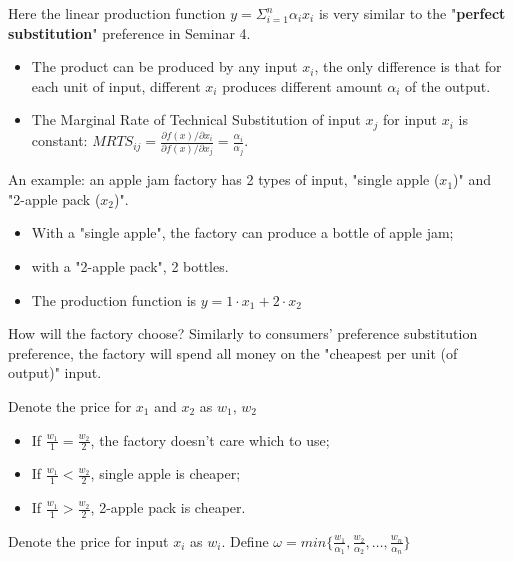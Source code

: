 \documentclass{article}
\begin{document}
\begin{mdframed}[backgroundcolor=blue!20,linecolor=white]

Here the linear production function $y = \Sigma^n_{i=1} \alpha_i x_i$ is very similar to the "\textbf{perfect substitution}" preference in Seminar 4.

\begin{itemize}

\item  The product can be produced by any input $x_i$, the only difference is that for each unit of input, different $x_i$ produces different amount $\alpha_i$ of the output. 

\item  The Marginal Rate of Technical Substitution of input $x_j$ for input $x_i$ is constant: $MRTS_{ij} = \frac{\partial f(x)/ \partial x_i}{\partial f(x)/ \partial x_j} = \frac{\alpha_i}{\alpha_j}$.

\end{itemize}

An example: an apple jam factory has 2 types of input, "single apple ($x_1$)" and "2-apple pack ($x_2$)".

\begin{itemize}
\item With a "single apple", the factory can produce a bottle of apple jam;
\item with a "2-apple pack", 2 bottles.
\item The production function is $y = 1 \cdot x_1 + 2 \cdot x_2$
\end{itemize}

How will the factory choose? Similarly to consumers' preference substitution preference, the factory will spend all money on the "cheapest per unit (of output)" input. 

Denote the price for $x_1$ and $x_2$ as $w_1$, $w_2$
\begin{itemize}
\item If $\frac{w_1}{1} = \frac{w_2}{2}$, the factory doesn't care which to use;
\item If $\frac{w_1}{1} < \frac{w_2}{2}$, single apple is cheaper;
\item If $\frac{w_1}{1} > \frac{w_2}{2}$, 2-apple pack is cheaper.
\end{itemize}

\end{mdframed}


Denote the price for input $x_i$  as $w_i$. Define $\omega = min \{\frac{w_1}{\alpha_1}, \frac{w_2}{\alpha_2}, \dots ,\frac{w_n}{\alpha_n}\} $
\end{document}
